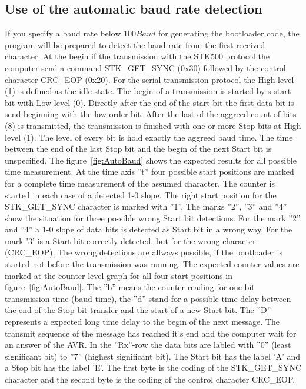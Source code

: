 \subsection{Use of the automatic baud rate detection}
\label{sec:autobaud}

If you specify a baud rate below \(100Baud\) for generating the bootloader code,
the program will be prepared to detect the baud rate from the first
received character.
At the begin if the transmission with the STK500 protocol the computer send
a command STK\_GET\_SYNC (0x30) followed by the control character CRC\_EOP (0x20).
For the serial transmission protocol the High level (1) is defined as the idle state.
The begin of a transmission is started by s start bit with Low level (0).
Directly after the end of the start bit the first data bit is send 
beginning with the low order bit. After the last of the aggreed count of bits (8)
is transmitted, the transmission is finished with one or more Stop bits at High level (1).
The level of every bit is hold exactly the aggreed baud time.
The time between the end of the last Stop bit and the begin of the next Start bit
is unspecified.
The figure~\ref{fig:AutoBaud} shows the expected results for all possible
time measurement. At the time axis ''t'' four possible start positions
are marked for a complete time measurement of the assumed character.
The counter is started in each case of a detected 1-0 slope.
The right start position for the STK\_GET\_SYNC character is marked with ''1''.
The marks ''2'', ''3'' and ''4'' show the situation for three possible
wrong Start bit detections.
For the mark ''2'' and ''4'' a 1-0 slope of data bits is detected as Start bit
in a wrong way. For the mark '3' is a Start bit correctly detected, but for the
wrong character (CRC\_EOP).
The wrong detections are allways possible, if the bootloader is started not
before the transmission was running.
The expected counter values are marked at the counter level graph for all
four start positions in figure~\ref{fig:AutoBaud}. 
The ''b'' means the counter reading for one bit transmission time (baud time),
the ''d'' stand for a possible time delay between the end of the Stop bit transfer 
and the start of a new Start bit.
The ''D'' represents a expected long time delay to the begin of the next message.
The transmit sequence of the message has reached it's end and the computer
wait for an answer of the AVR.
In the ''Rx''-row the data bits are labled with ''0'' (least significant bit)
to ''7'' (highest significant bit). The Start bit has the label 'A' and
a Stop bit has the label 'E'.
The first byte is the coding of the STK\_GET\_SYNC character and the second byte
is the coding of the control character CRC\_EOP.

